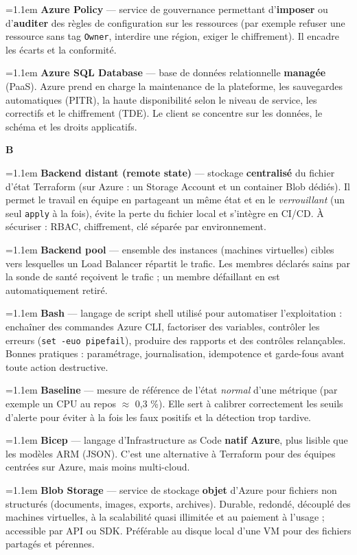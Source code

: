 \documentclass[11pt,a4paper]{article}
\newcommand{\co}[1]{\texttt{\small #1}}
\newcommand{\lettre}[1]{%
  \par\addvspace{9pt}\needspace{4.5\baselineskip}%
  \markright{#1}%
  {\noindent\sffamily\bfseries\Large\color{azure}#1}%
  \nobreak\vspace{0.4mm}{\color{azure!45}\hrule height 1pt}\nobreak\vspace{3mm}\par}
\newcommand{\df}[2]{%
  \par\addvspace{4pt}\needspace{2\baselineskip}%
  \hangindent=1.1em\hangafter=1
  {\sffamily\bfseries\color{azuredark}#1} — #2\par}
\begin{document}
\df{Azure Policy}{service de gouvernance permettant d'\textbf{imposer} ou d'\textbf{auditer} des règles de configuration sur les ressources (par exemple refuser une ressource sans tag \co{Owner}, interdire une région, exiger le chiffrement). Il encadre les écarts et la conformité.}

\df{Azure SQL Database}{base de données relationnelle \textbf{managée} (PaaS). Azure prend en charge la maintenance de la plateforme, les sauvegardes automatiques (PITR), la haute disponibilité selon le niveau de service, les correctifs et le chiffrement (TDE). Le client se concentre sur les données, le schéma et les droits applicatifs.}

\lettre{B}

\df{Backend distant (remote state)}{stockage \textbf{centralisé} du fichier d'état Terraform (sur Azure : un Storage Account et un container Blob dédiés). Il permet le travail en équipe en partageant un même état et en le \emph{verrouillant} (un seul \co{apply} à la fois), évite la perte du fichier local et s'intègre en CI/CD. À sécuriser : RBAC, chiffrement, clé séparée par environnement.}

\df{Backend pool}{ensemble des instances (machines virtuelles) cibles vers lesquelles un Load Balancer répartit le trafic. Les membres déclarés sains par la sonde de santé reçoivent le trafic ; un membre défaillant en est automatiquement retiré.}

\df{Bash}{langage de script shell utilisé pour automatiser l'exploitation : enchaîner des commandes Azure CLI, factoriser des variables, contrôler les erreurs (\co{set -euo pipefail}), produire des rapports et des contrôles relançables. Bonnes pratiques : paramétrage, journalisation, idempotence et garde-fous avant toute action destructive.}

\df{Baseline}{mesure de référence de l'état \emph{normal} d'une métrique (par exemple un CPU au repos $\approx$ 0,3 \%). Elle sert à calibrer correctement les seuils d'alerte pour éviter à la fois les faux positifs et la détection trop tardive.}

\df{Bicep}{langage d'Infrastructure as Code \textbf{natif Azure}, plus lisible que les modèles ARM (JSON). C'est une alternative à Terraform pour des équipes centrées sur Azure, mais moins multi-cloud.}

\df{Blob Storage}{service de stockage \textbf{objet} d'Azure pour fichiers non structurés (documents, images, exports, archives). Durable, redondé, découplé des machines virtuelles, à la scalabilité quasi illimitée et au paiement à l'usage ; accessible par API ou SDK. Préférable au disque local d'une VM pour des fichiers partagés et pérennes.}
\end{document}

